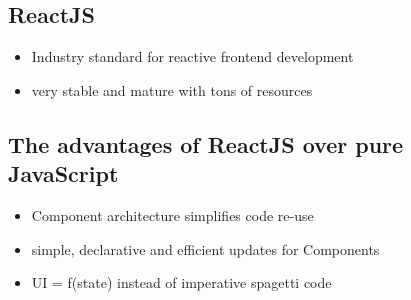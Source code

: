 \subsection{ReactJS}

\begin{itemize}
  \item Industry standard for reactive frontend development
  \item very stable and mature with tons of resources
\end{itemize}

\subsection{The advantages of ReactJS over pure JavaScript}

\begin{itemize}
  \item Component architecture simplifies code re-use
  \item simple, declarative and efficient updates for Components
  \item UI = f(state) instead of imperative spagetti code
\end{itemize}
